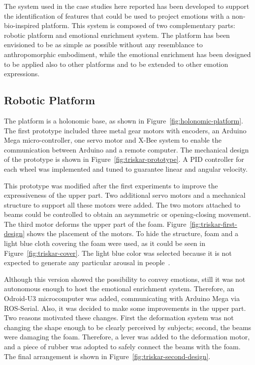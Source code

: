 The system used in the case studies here reported has been developed to support the identification of features that could be used to project emotions with a non-bio-inspired platform. This system is composed of two complementary parts: robotic platform and emotional enrichment system. The platform has been envisioned to be as simple as possible without any resemblance to anthropomorphic embodiment, while the emotional enrichment has been designed to be applied also to other platforms and to be extended to other emotion expressions.
 
\subsection{Robotic Platform}
The platform is a holonomic base, as shown in Figure~\ref{fig:holonomic-platform}. The first prototype included three metal gear motors with encoders, an Arduino Mega micro-controller, one servo motor and X-Bee system to enable the communication between Arduino and a remote computer. The mechanical design of the prototype is shown in Figure~\ref{fig:triskar-prototype}. A PID controller for each wheel was implemented and tuned to guarantee linear and angular velocity.

This prototype was modified after the first experiments to improve the expressiveness of the upper part. Two additional servo motors and a mechanical structure to support all these motors were added. The two motors attached to beams could be controlled to obtain an asymmetric or opening-closing movement. 
The third motor deforms the upper part of the foam. Figure~\ref{fig:triskar-first-design} shows the placement of the motors. To hide the structure, foam and a light blue cloth covering the foam were used, as it could be seen  in Figure~\ref{fig:triskar-cover}. The light blue color was selected because it is not expected to generate any particular arousal in people~\cite{Naz2012}. 

Although this version showed the possibility to convey emotions, still it was not autonomous enough to host the emotional enrichment system. Therefore, an Odroid-U3 microcomputer was added, communicating with Arduino Mega via ROS-Serial.
Also, it was decided to make some improvements in the upper part. Two reasons motivated these changes. First the deformation system was not changing the shape enough to be clearly perceived by subjects; second, the beams were damaging the foam. Therefore, a lever  was added to the deformation motor, and a piece of rubber was adopted to safely connect the beams with the foam. The final arrangement is shown in Figure~\ref{fig:triskar-second-design}.
 
